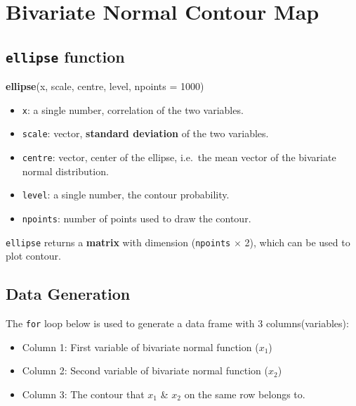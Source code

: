 \documentclass[]{book}
\newenvironment{Shaded}{\begin{snugshade}}{\end{snugshade}}
\newcommand{\KeywordTok}[1]{\textcolor[rgb]{0.13,0.29,0.53}{\textbf{#1}}}
\newcommand{\DataTypeTok}[1]{\textcolor[rgb]{0.13,0.29,0.53}{#1}}
\newcommand{\DecValTok}[1]{\textcolor[rgb]{0.00,0.00,0.81}{#1}}
\newcommand{\NormalTok}[1]{#1}
\theoremstyle{definition}
\theoremstyle{definition}
\theoremstyle{definition}
\theoremstyle{remark}
\begin{document}
\section{Bivariate Normal Contour
Map}\label{bivariate-normal-contour-map}

\subsection{\texorpdfstring{\texttt{ellipse}
function}{ellipse function}}\label{ellipse-function}

\begin{Shaded}
\begin{Highlighting}[]
\KeywordTok{ellipse}\NormalTok{(x, scale, centre, level, }\DataTypeTok{npoints =} \DecValTok{1000}\NormalTok{)}
\end{Highlighting}
\end{Shaded}

\begin{itemize}
\item
  \texttt{x}: a single number, correlation of the two variables.
\item
  \texttt{scale}: vector, \textbf{standard deviation} of the two
  variables.
\item
  \texttt{centre}: vector, center of the ellipse, i.e.~the mean vector
  of the bivariate normal distribution.
\item
  \texttt{level}: a single number, the contour probability.
\item
  \texttt{npoints}: number of points used to draw the contour.
\end{itemize}

\texttt{ellipse} returns a \textbf{matrix} with dimension
(\texttt{npoints} \(\times\) 2), which can be used to plot contour.

\subsection{Data Generation}\label{data-generation}

The \texttt{for} loop below is used to generate a data frame with 3
columns(variables):

\begin{itemize}
\item
  Column 1: First variable of bivariate normal function (\(x_1\))
\item
  Column 2: Second variable of bivariate normal function (\(x_2\))
\item
  Column 3: The contour that \(x_1\) \& \(x_2\) on the same row belongs
  to.
\end{itemize}
\end{document}
